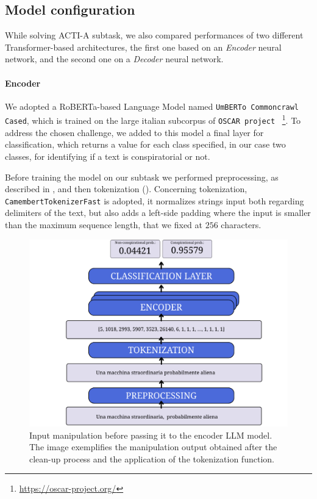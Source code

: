 \documentclass[11pt]{article}
\begin{document}
\subsection{Model configuration}\label{sec:model-config}
While solving ACTI-A subtask, we also compared performances of two different Transformer-based architectures,
the first one based on an \emph{Encoder} neural network, and the second one on a \emph{Decoder} neural network.

\paragraph{Encoder}

We adopted a RoBERTa-based Language Model named \texttt{UmBERTo Commoncrawl Cased},
which is trained on the large italian subcorpus of \texttt{OSCAR project} ~\footnote{\url{https://oscar-project.org/}}.
%
To address the chosen challenge, we added to this model a final layer for classification,
which returns a value for each class specified,
in our case two classes, for identifying if a text is conspiratorial or not.

Before training the model on our subtask we performed preprocessing, as described in ,
and then tokenization ().
%
Concerning tokenization, \texttt{CamembertTokenizerFast} is adopted,
it normalizes strings input both regarding delimiters of the text,
but also adds a left-side padding where the input is smaller than the maximum sequence length,
that we fixed at $ 256 $ characters.
%
\begin{figure}
  \centering
  \includegraphics[width=\linewidth]{figures/encoder.pdf}
  \caption{
    Input manipulation before passing it to the encoder LLM model.
    The image exemplifies the manipulation output obtained after the clean-up process and the application of the tokenization function.
  }
  \label{fig:preprocessing-and-tokenization-encoder}
\end{figure}
\end{document}
